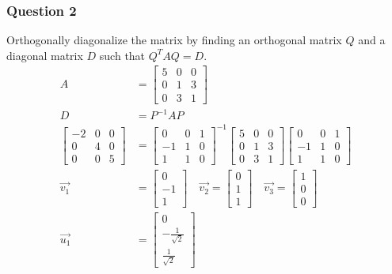 \documentclass{math}
\begin{document}
\subsubsection*{Question 2}
Orthogonally diagonalize the matrix by finding an orthogonal matrix \( Q \)
and a diagonal matrix \( D \) such that \( Q^TAQ = D \).
\begin{align*}
  A &= \begin{bmatrix}
    5 & 0 & 0 \\
    0 & 1 & 3 \\
    0 & 3 & 1
  \end{bmatrix} \\
  D &= P^{-1}AP \\
  \begin{bmatrix}
    -2 & 0 & 0 \\
    0 & 4 & 0 \\
    0 & 0 & 5
  \end{bmatrix} &= \begin{bmatrix}
    0 & 0 & 1 \\
    -1 & 1 & 0 \\
    1 & 1 & 0
  \end{bmatrix}^{-1}\begin{bmatrix}
    5 & 0 & 0 \\
    0 & 1 & 3 \\
    0 & 3 & 1
  \end{bmatrix}\begin{bmatrix}
    0 & 0 & 1 \\
    -1 & 1 & 0 \\
    1 & 1 & 0
  \end{bmatrix} \\
  \vec{v_1} &= \begin{bmatrix}0 \\ -1 \\ 1\end{bmatrix} \quad
    \vec{v_2} = \begin{bmatrix}0 \\ 1 \\ 1\end{bmatrix} \quad
    \vec{v_3} = \begin{bmatrix}1 \\ 0 \\ 0\end{bmatrix} \\
  \vec{u_1} &= \begin{bmatrix}
    0 \\ -\frac{1}{\sqrt{2}} \\ \frac{1}{\sqrt{2}}

\end{bmatrix}
\end{align*}
\end{document}
